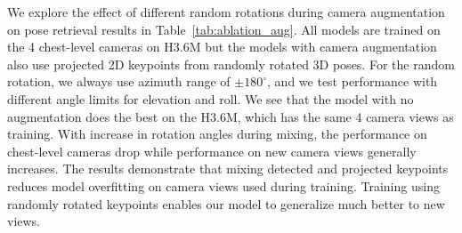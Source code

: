 \begin{table}
  \centering
  \caption{Additional ablation study results of Pr-VIPE on H3.6M with the number of samples $K$ and margin parameter $\beta$.} \label{tab:ablation}
\end{table}

 We explore the effect of different random rotations during camera augmentation on pose retrieval results in Table~\ref{tab:ablation_aug}. All models are trained on the 4 chest-level cameras on H3.6M but the models with camera augmentation also use projected 2D keypoints from randomly rotated 3D poses. For the random rotation, we always use azimuth range of $\pm180^{\circ}$, and we test performance with different angle limits for elevation and roll. We see that the model with no augmentation does the best on the H3.6M, which has the same 4 camera views as training. With increase in rotation angles during mixing, the performance on chest-level cameras drop while performance on new camera views generally increases. The results demonstrate that mixing detected and projected keypoints reduces model overfitting on camera views used during training. Training using randomly rotated keypoints enables our model to generalize much better to new views.

